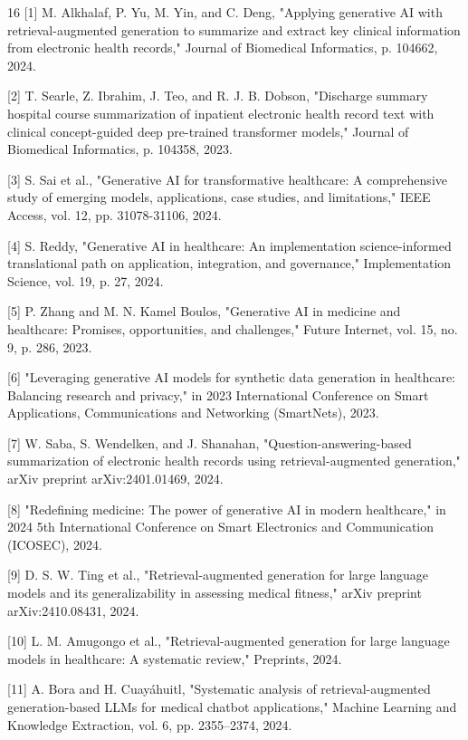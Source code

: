 \documentclass[conference]{IEEEtran}
\begin{document}
\begin{thebibliography}{16}
[1] M. Alkhalaf, P. Yu, M. Yin, and C. Deng, "Applying generative AI with 
    retrieval-augmented generation to summarize and extract key clinical 
    information from electronic health records," Journal of Biomedical 
    Informatics, p. 104662, 2024.

[2] T. Searle, Z. Ibrahim, J. Teo, and R. J. B. Dobson, "Discharge summary 
    hospital course summarization of inpatient electronic health record text 
    with clinical concept-guided deep pre-trained transformer models," Journal 
    of Biomedical Informatics, p. 104358, 2023.

[3] S. Sai et al., "Generative AI for transformative healthcare: A comprehensive 
    study of emerging models, applications, case studies, and limitations," IEEE 
    Access, vol. 12, pp. 31078-31106, 2024.

[4] S. Reddy, "Generative AI in healthcare: An implementation science-informed 
    translational path on application, integration, and governance," 
    Implementation Science, vol. 19, p. 27, 2024.

[5] P. Zhang and M. N. Kamel Boulos, "Generative AI in medicine and healthcare: 
    Promises, opportunities, and challenges," Future Internet, vol. 15, no. 9, 
    p. 286, 2023.

[6] "Leveraging generative AI models for synthetic data generation in healthcare: Balancing research and privacy," in 2023 International Conference on Smart Applications, Communications and Networking (SmartNets), 2023.

[7] W. Saba, S. Wendelken, and J. Shanahan, "Question-answering-based summarization of electronic health records using retrieval-augmented generation," arXiv preprint arXiv:2401.01469, 2024.

[8] "Redefining medicine: The power of generative AI in modern healthcare," in 2024 5th International Conference on Smart Electronics and Communication (ICOSEC), 2024.

[9] D. S. W. Ting et al., "Retrieval-augmented generation for large language models and its generalizability in assessing medical fitness," arXiv preprint arXiv:2410.08431, 2024.

[10] L. M. Amugongo et al., "Retrieval-augmented generation for large language models in healthcare: A systematic review," Preprints, 2024.

[11] A. Bora and H. Cuayáhuitl, "Systematic analysis of retrieval-augmented generation-based LLMs for medical chatbot applications," Machine Learning and Knowledge Extraction, vol. 6, pp. 2355–2374, 2024.


\end{thebibliography}
\end{document}
